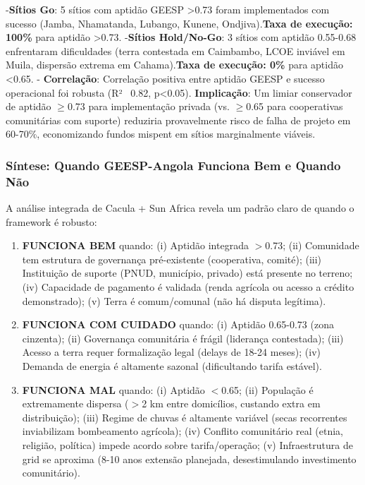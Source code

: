 \documentclass[12pt, a4paper]{article}
\begin{document}
-\textbf{Sítios Go}: 5 sítios com aptidão GEESP >0.73 foram implementados com sucesso (Jamba, Nhamatanda, Lubango, Kunene, Ondjiva).\textbf{Taxa de execução: 100\%} para aptidão >0.73.
-\textbf{Sítios Hold/No-Go}: 3 sítios com aptidão 0.55-0.68 enfrentaram dificuldades (terra contestada em Caimbambo, LCOE inviável em Muila, dispersão extrema em Cahama).\textbf{Taxa de execução: 0\%} para aptidão <0.65.
-
\textbf{Correlação}: Correlação positiva entre aptidão GEESP e sucesso operacional foi robusta (R² ~0.82, p<0.05).
\textbf{Implicação}: Um limiar conservador de aptidão $\geq$0.73 para implementação privada (vs. $\geq$0.65 para cooperativas comunitárias com suporte) reduziria provavelmente risco de falha de projeto em 60-70\%, economizando fundos mispent em sítios marginalmente viáveis.

\subsubsection*{Síntese: Quando GEESP-Angola Funciona Bem e Quando Não}

A análise integrada de Cacula + Sun Africa revela um padrão claro de quando o framework é robusto:

\begin{enumerate}
\item\textbf{FUNCIONA BEM} quando: (i) Aptidão integrada $>$0.73; (ii) Comunidade tem estrutura de governança pré-existente (cooperativa, comité); (iii) Instituição de suporte (PNUD, município, privado) está presente no terreno; (iv) Capacidade de pagamento é validada (renda agrícola ou acesso a crédito demonstrado); (v) Terra é comum/comunal (não há disputa legítima).

\item\textbf{FUNCIONA COM CUIDADO} quando: (i) Aptidão 0.65-0.73 (zona cinzenta); (ii) Governança comunitária é frágil (liderança contestada); (iii) Acesso a terra requer formalização legal (delays de 18-24 meses); (iv) Demanda de energia é altamente sazonal (dificultando tarifa estável).

\item\textbf{FUNCIONA MAL} quando: (i) Aptidão $<$0.65; (ii) População é extremamente dispersa ($>$2 km entre domicílios, custando extra em distribuição); (iii) Regime de chuvas é altamente variável (secas recorrentes inviabilizam bombeamento agrícola); (iv) Conflito comunitário real (etnia, religião, política) impede acordo sobre tarifa/operação; (v) Infraestrutura de grid se aproxima (8-10 anos extensão planejada, desestimulando investimento comunitário).

\end{enumerate}
\end{document}
